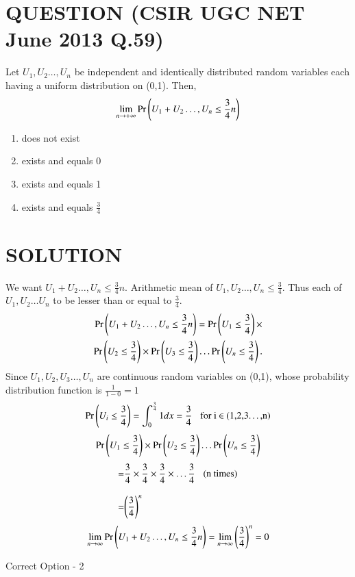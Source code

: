 \documentclass[journal,12pt,twocolumn]{IEEEtran}
\begin{document}
\section*{QUESTION (CSIR UGC NET June 2013 Q.59)}
Let $U_1,U_2\dots,U_n$ be independent and identically distributed random variables each
having a uniform distribution on (0,1). Then,$$\lim_{n \to +\infty} \Pr\left(U_1+U_2\dots,U_n\leq \frac{3}{4}n\right)$$
\begin{enumerate}
    \item does not exist
    \item exists and equals 0
    \item exists and equals 1
    \item exists and equals $\frac{3}{4}$
\end{enumerate}
\section*{SOLUTION}
We want $U_1+U_2\dots,U_n\leq\displaystyle{\frac{3}{4}}n$. 
Arithmetic mean of $U_1,U_2\dots,U_n \leq \displaystyle{\frac{3}{4}}$. 
Thus each of $U_1,U_2 \dots U_n$ to be lesser than or equal to $\displaystyle{\frac{3}{4}}$.
\begin{align}
    \begin{split}
    \Pr\left(U_1+U_2\dots,U_n\leq \displaystyle{\frac{3}{4}}n\right)=\Pr\left(U_1\leq \displaystyle{\frac{3}{4}}\right) \times \\\Pr\left(U_2\leq \displaystyle{\frac{3}{4}}\right) \times \Pr\left(U_3\leq \displaystyle{\frac{3}{4}}\right) \dots \Pr\left(U_n\leq \displaystyle{\frac{3}{4}}\right).
    \end{split}
\end{align}
Since $U_1,U_2,U_3\dots,U_n$ are continuous random variables on (0,1), whose probability distribution function is $\displaystyle{\frac{1}{1-0}} = 1$
\begin{align}
    \Pr\left(U_i\leq \displaystyle{\frac{3}{4}}\right) = \int_{0}^{\frac{3}{4}} 1 dx = \displaystyle{\frac{3}{4}}\hspace{0.3cm}\text{for i $\in$ {(1,2,3\dots,n)}}\\
\end{align} 
\begin{align}
    \Pr\left(U_1\leq \displaystyle{\frac{3}{4}}\right) \times \Pr\left(U_2\leq \displaystyle{\frac{3}{4}}\right) \dots \Pr\left(U_n\leq \displaystyle{\frac{3}{4}}\right)
\end{align}
\begin{align}
    = &\displaystyle{\frac{3}{4} \times \frac{3}{4} \times \frac{3}{4} \times\dots \frac{3}{4} \hspace{0.3cm}\text{(n times)}}\\[0.3cm]
    = & \displaystyle{\ensuremath{\left(\frac{3}{4}\right)}^{n}}
\end{align}
\begin{align}
        \lim_{n\to\infty} \Pr\left(U_1+U_2\dots,U_n\leq \frac{3}{4}n\right) = \lim_{n\to\infty} \displaystyle{\ensuremath{\left(\frac{3}{4}\right)}^{n}}= 0
\end{align}
\begin{center}
    Correct Option - 2
\end{center}
\end{document}
